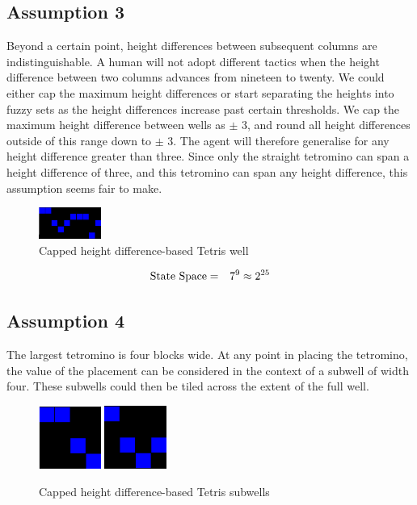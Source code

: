 \documentclass{rucsthesis}
\begin{document}
\subsection*{Assumption 3}

Beyond a certain point, height differences between subsequent columns are indistinguishable. A human will not adopt different tactics when the height difference between two columns advances from nineteen to twenty. We could either cap the maximum height differences or start separating the heights into fuzzy sets as the height differences increase past certain thresholds. We cap the maximum height difference between wells as $\pm$ 3, and round all height differences outside of this range down to $\pm$ 3. The agent will therefore generalise for any height difference greater than three. Since only the straight tetromino can span a height difference of three, and this tetromino can span any height difference, this assumption seems fair to make. 

\begin{figure}[h]
\centering
\includegraphics[width=0.8in]{capdiffheightwell.png}
\caption{Capped height difference-based Tetris well}
\label{fig:capdiffheightwell}
\end{figure}

\begin{eqnarray*}
\centering
\textrm{State Space} & = & 7^{9} \approx 2^{25}
\end{eqnarray*}

\subsection*{Assumption 4}

The largest tetromino is four blocks wide. At any point in placing the tetromino, the value of the placement can be considered in the context of a subwell of width four. These subwells could then be tiled across the extent of the full well.

\begin{figure}[h]
\centering
\includegraphics[width=0.8in]{reducedwell.png}
\includegraphics[width=0.8in]{reducedwell2.png}
\caption{Capped height difference-based Tetris subwells}
\label{fig:redwell}
\end{figure}
\end{document}
